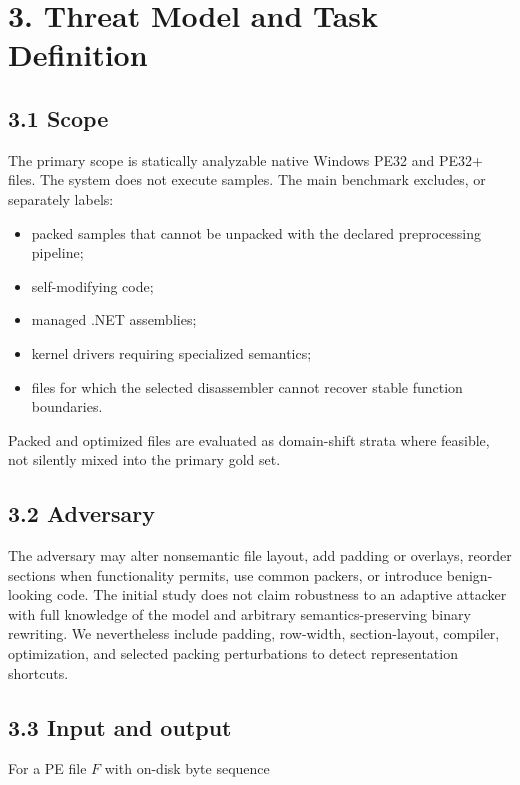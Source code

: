 \documentclass[
  10pt,
]{article}
\providecommand{\tightlist}{%
  \setlength{\itemsep}{0pt}\setlength{\parskip}{0pt}}
\begin{document}
\section{3. Threat Model and Task
Definition}\label{threat-model-and-task-definition}

\subsection{3.1 Scope}\label{scope}

The primary scope is statically analyzable native Windows PE32 and PE32+
files. The system does not execute samples. The main benchmark excludes,
or separately labels:

\begin{itemize}
\tightlist
\item
  packed samples that cannot be unpacked with the declared preprocessing
  pipeline;
\item
  self-modifying code;
\item
  managed .NET assemblies;
\item
  kernel drivers requiring specialized semantics;
\item
  files for which the selected disassembler cannot recover stable
  function boundaries.
\end{itemize}

Packed and optimized files are evaluated as domain-shift strata where
feasible, not silently mixed into the primary gold set.

\subsection{3.2 Adversary}\label{adversary}

The adversary may alter nonsemantic file layout, add padding or
overlays, reorder sections when functionality permits, use common
packers, or introduce benign-looking code. The initial study does not
claim robustness to an adaptive attacker with full knowledge of the
model and arbitrary semantics-preserving binary rewriting. We
nevertheless include padding, row-width, section-layout, compiler,
optimization, and selected packing perturbations to detect
representation shortcuts.

\subsection{3.3 Input and output}\label{input-and-output}

For a PE file \(F\) with on-disk byte sequence
\end{document}
